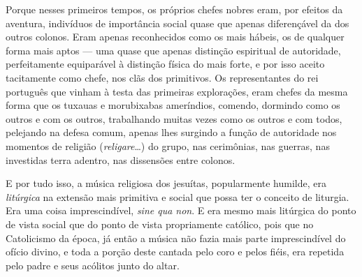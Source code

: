 Porque nesses primeiros tempos, os próprios chefes nobres eram, por
efeitos da aventura, indivíduos de importância social quase que apenas
diferençável da dos outros colonos. Eram apenas reconhecidos como os
mais hábeis, os de qualquer forma mais aptos --- uma quase que apenas
distinção espiritual de autoridade, perfeitamente equiparável à
distinção física do mais forte, e por isso aceito tacitamente como
chefe, nos clãs dos primitivos. Os representantes do rei português que
vinham à testa das primeiras explorações, eram chefes da mesma forma que
os tuxauas e morubixabas ameríndios, comendo, dormindo como os outros e
com os outros, trabalhando muitas vezes como os outros e com todos,
pelejando na defesa comum, apenas lhes surgindo a função de autoridade
nos momentos de religião (\textit{religare}\ldots{}) do grupo, nas cerimônias, nas
guerras, nas investidas terra adentro, nas dissensões entre colonos.

E por tudo isso, a música religiosa dos jesuítas, popularmente humilde,
era \textit{litúrgica} na extensão mais primitiva e social que possa ter o
conceito de liturgia. Era uma coisa imprescindível, \textit{sine qua non}. E era
mesmo mais litúrgica do ponto de vista social que do ponto de vista
propriamente católico, pois que no Catolicismo da época, já então a
música não fazia mais parte imprescindível do ofício divino, e toda a
porção deste cantada pelo coro e pelos fiéis, era repetida pelo padre e
seus acólitos junto do altar.

